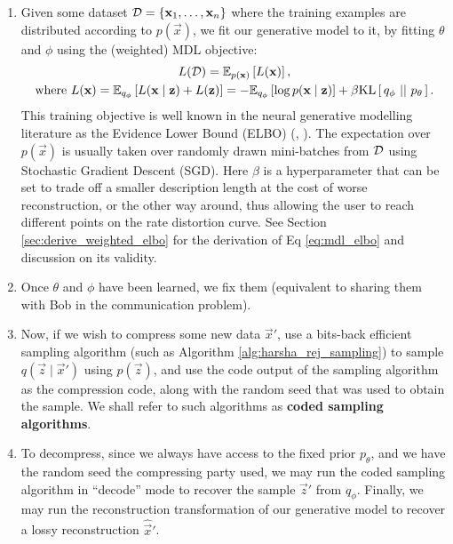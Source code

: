 \begin{enumerate}
\item Given some dataset $\mathcal{D} = \{\mathbf{x}_1, \hdots, \mathbf{x}_n\}$ where the
  training examples are distributed according to $p(\vec{x})$, we fit our
  generative model to it, by fitting $\theta$ and $\phi$ using the (weighted) MDL
  objective:
  \begin{equation}
    \label{eq:mdl_elbo}
    \begin{gathered}
      L(\Data) = \Exp{L(\vec{x})}{p(\vec{x})}, \\
      \text{where } L(\vec{x}) = \Exp{L(\vec{x} \mid \vec{z}) + L(\vec{z})}{q_\phi}
      =  -\Exp{\log p(\vec{x} \mid \vec{z})}{q_\phi} + \beta\KL{q_\phi}{p_\theta}.
    \end{gathered}
  \end{equation}
  This training objective is well known in the neural generative modelling
  literature as the Evidence Lower Bound (ELBO) (\cite{kingma2013auto},
  \cite{higgins2017beta}). The expectation over $p(\vec{x})$ is usually taken over
  randomly drawn mini-batches from $\mathcal{D}$ using Stochastic Gradient Descent (SGD).
  Here $\beta$ is a
  hyperparameter that can be set to trade off a smaller description length at
  the cost of worse reconstruction, or the other way around, thus allowing the
  user to reach different points on the rate distortion curve. See Section
  \ref{sec:derive_weighted_elbo} for the derivation of Eq \ref{eq:mdl_elbo} and
  discussion on its validity.

  \item Once $\theta$ and $\phi$ have been learned, we fix them (equivalent to
    sharing them with Bob in the communication problem).

  \item Now, if we wish to compress some new data $\vec{x}'$, use a bits-back
    efficient sampling algorithm (such as Algorithm
    \ref{alg:harsha_rej_sampling}) to sample $q(\vec{z} \mid \vec{x}')$ using
    $p(\vec{z})$, and use the code output of the sampling algorithm as the
    compression code, along with the random seed that was used to obtain the sample. 
    We shall refer to such algorithms as \textbf{coded sampling algorithms}.

  \item To decompress, since we always have access to the fixed prior
    $p_\theta$, and we have the random seed the compressing party used, we may
    run the coded sampling algorithm in ``decode'' mode to recover the sample $\vec{z}'$
    from $q_\phi$. Finally, we may run the reconstruction transformation of our
    generative model to recover a lossy reconstruction $\hat{\vec{x}}'$.
\end{enumerate}

